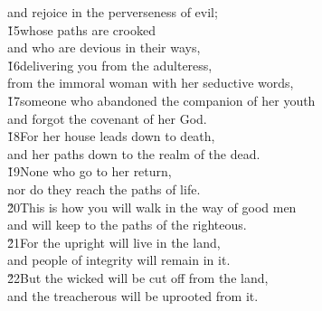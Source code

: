 \begin{poetry}
\poemll    and rejoice in the perverseness of evil; \\
\poeml \v{15}whose paths are crooked \\
\poemll    and who are devious in their ways, \\
\poeml \v{16}delivering you from the adulteress, \\
\poemll    from the immoral woman with her seductive words, \\
\poeml \v{17}someone who abandoned the companion of her youth \\
\poemlll       and forgot the covenant of her God. \\
\poeml \v{18}For her house leads down to death, \\
\poemll    and her paths down to the realm of the dead. \\
\poeml \v{19}None who go to her return, \\
\poeml nor do they reach the paths of life. \\
\poeml \v{20}This is how you will walk in the way of good men \\
\poemll    and will keep to the paths of the righteous. \\
\poeml \v{21}For the upright will live in the land, \\
\poemll    and people of integrity will remain in it. \\
\poeml \v{22}But the wicked will be cut off from the land, \\
\poemll    and the treacherous will be uprooted from it.
\end{poetry}

